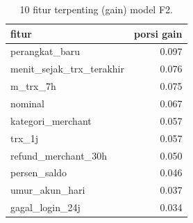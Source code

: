 \begin{table}[ht]
\centering\small
\begin{tabular}{lr}
\toprule
fitur & porsi gain \\
\midrule
perangkat\_baru & 0.097 \\
menit\_sejak\_trx\_terakhir & 0.076 \\
m\_trx\_7h & 0.075 \\
nominal & 0.067 \\
kategori\_merchant & 0.057 \\
trx\_1j & 0.057 \\
refund\_merchant\_30h & 0.050 \\
persen\_saldo & 0.046 \\
umur\_akun\_hari & 0.037 \\
gagal\_login\_24j & 0.034 \\
\bottomrule
\end{tabular}
\caption{10 fitur terpenting (gain) model F2.}
\label{tab:t2_importance}
\end{table}
